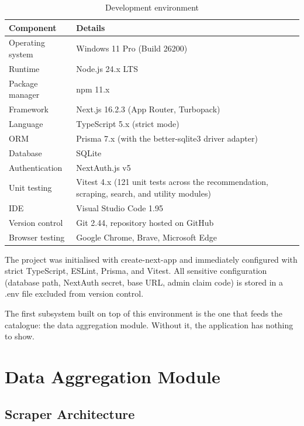 \begin{table}[H]
  \caption{Development environment}
  \label{tab:dev-env}
  \centering\small
  \begin{tabular}{|p{4cm}|p{11cm}|}
    \hline
    \textbf{Component}   & \textbf{Details} \\
    \hline
    Operating system     & Windows 11 Pro (Build 26200) \\
    \hline
    Runtime              & Node.js 24.x LTS \\
    \hline
    Package manager      & npm 11.x \\
    \hline
    Framework            & Next.js 16.2.3 (App Router, Turbopack) \\
    \hline
    Language             & TypeScript 5.x (strict mode) \\
    \hline
    ORM                  & Prisma 7.x (with the better-sqlite3 driver adapter) \\
    \hline
    Database             & SQLite \\
    \hline
    Authentication       & NextAuth.js v5 \\
    \hline
    Unit testing         & Vitest 4.x (121 unit tests across the recommendation, scraping, search, and utility modules) \\
    \hline
    IDE                  & Visual Studio Code 1.95 \\
    \hline
    Version control      & Git 2.44, repository hosted on GitHub \\
    \hline
    Browser testing      & Google Chrome, Brave, Microsoft Edge \\
    \hline
  \end{tabular}
\end{table}

The project was initialised with create-next-app and immediately configured with strict TypeScript, ESLint, Prisma, and Vitest. All sensitive configuration (database path, NextAuth secret, base URL, admin claim code) is stored in a .env file excluded from version control.

The first subsystem built on top of this environment is the one that feeds the catalogue: the data aggregation module. Without it, the application has nothing to show.

\section{Data Aggregation Module}

\subsection{Scraper Architecture}


